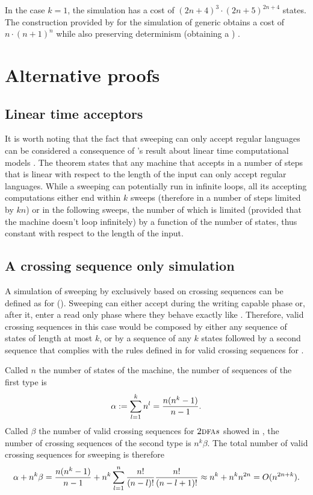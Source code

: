 In the case $k=1$, the simulation has a cost of $(2n+4)^3\cdot(2n+5)^{2n+4}$ states.
The construction provided by \citeauthor{PigPis14} \cite{PigPis14} for the simulation of generic \ODLA obtains a cost of $n\cdot (n+1)^n$ while also preserving determinism (\ie obtaining a \ODFA) \cite{PigPis14}.



\section{Alternative proofs}\label{sec:alt-proofs}


\subsection{Linear time acceptors}
It is worth noting that the fact that sweeping \kDLAs can only accept regular languages can be considered a consequence of \citeauthor{Hen65}'s result about linear time computational models \cite{Hen65}.
The theorem states that any machine that accepts in a number of steps that is linear with respect to the length of the input can only accept regular languages.
While a sweeping \kLA can potentially run in infinite loops, all its accepting computations either end within $k$ sweeps (therefore in a number of steps limited by $kn$) or in the following sweeps, the number of which is limited (provided that the machine doesn't loop infinitely) by a function of the number of states, thus constant with respect to the length of the input.


\subsection{A crossing sequence only simulation}
A simulation of sweeping \kDLAs by \ONFAs exclusively based on crossing sequences can be defined as for \TDFAs ().
Sweeping \kDLAs can either accept during the writing capable phase or, after it, enter a read only phase where they behave exactly like \TDFAs.
Therefore, valid crossing sequences in this case would be composed by either any sequence of states of length at most $k$, or by a sequence of any $k$ states followed by a second sequence that complies with the rules defined in  for valid crossing sequences for \TDFAs.

Called $n$ the number of states of the machine, the number of sequences of the first type is
\begin{equation*}
	\alpha:=\sum_{l=1}^k n^l = \frac{n(n^k-1)}{n-1} \text.
\end{equation*}
Called $\beta$ the number of valid crossing sequences for $\textsc{2dfa}{}s$ showed in , the number of crossing sequences of the second type is $n^k \beta$.
The total number of valid crossing sequences for sweeping \kDLAs is therefore
\begin{equation*}
	\alpha+n^k\beta = \frac{n(n^k-1)}{n-1}+n^k\sum_{l=1}^n \frac{n!}{(n-l)!}\frac{n!}{(n-l+1)!} \approx n^k + n^k n^{2n} = O(n^{2n+k}) \text.
\end{equation*}

